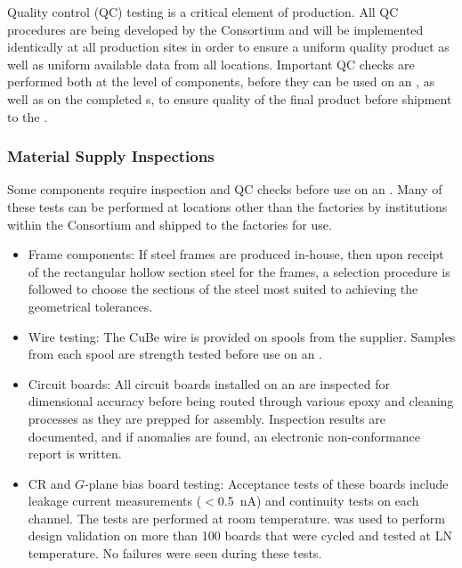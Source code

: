 Quality control (QC) testing is a critical element of  production.  All QC procedures are being developed by the Consortium and will be implemented identically at all production sites in order to ensure a uniform quality product as well as uniform available data from all locations.  Important QC checks are performed both at the level of components, before they can be used on an , as well as on the completed s, to ensure quality of the final product before shipment to the .  

\subsubsection{Material Supply Inspections}

Some components require inspection and QC checks before use on an .  Many of these tests can be performed at locations other than the  factories by institutions within the Consortium and shipped to the factories for use. 

\begin{itemize}
\item Frame components: If  steel frames are produced in-house, then upon receipt of the rectangular hollow section steel for the frames, a selection procedure is followed to choose the sections of the steel most suited to achieving the geometrical tolerances. 
\item Wire testing: The CuBe wire is provided on spools from the supplier. Samples from each spool are strength tested before use on an .
\item Circuit boards: All circuit boards installed on an  are inspected for dimensional accuracy before being routed through various epoxy and cleaning processes as they are prepped for assembly. Inspection results are documented, and if anomalies are found, an electronic non-conformance report is written.  %
\item CR and $G$-plane bias board testing: Acceptance tests of these boards include leakage current measurements ($<$\SI{0.5}{nA}) and continuity tests on each channel.  The tests are performed at room temperature.  was used to perform design validation on more than \num{100} boards that were cycled and tested at LN temperature. No failures were seen during these tests. 
\end{itemize}


